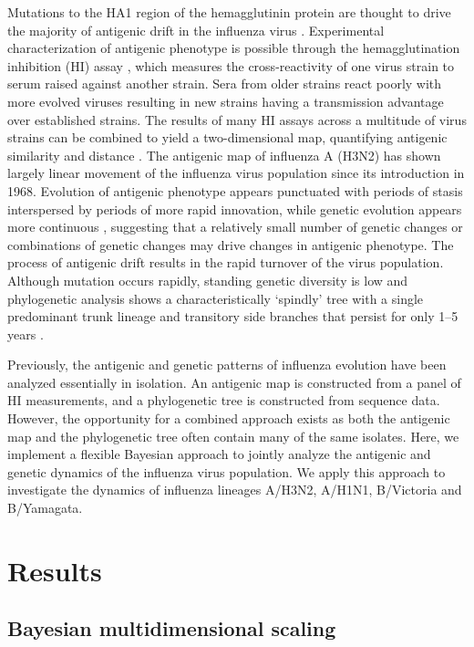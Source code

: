 \documentclass[11pt,oneside,letterpaper]{article}
\begin{document}
Mutations to the HA1 region of the hemagglutinin protein are thought to drive the majority of antigenic drift in the influenza virus \cite{Nelson07NatRevGenet}. 
Experimental characterization of antigenic phenotype is possible through the hemagglutination inhibition (HI) assay \cite{Hirst43}, which measures the cross-reactivity of one virus strain to serum raised against another strain. 
Sera from older strains react poorly with more evolved viruses resulting in new strains having a transmission advantage over established strains. 
The results of many HI assays across a multitude of virus strains can be combined to yield a two-dimensional map, quantifying antigenic similarity and distance \cite{Smith04}. 
The antigenic map of influenza A (H3N2) has shown largely linear movement of the influenza virus population since its introduction in 1968. 
Evolution of antigenic phenotype appears punctuated with periods of stasis interspersed by periods of more rapid innovation, while genetic evolution appears more continuous \cite{Smith04}, suggesting that a relatively small number of genetic changes or combinations of genetic changes may drive changes in antigenic phenotype. 
The process of antigenic drift results in the rapid turnover of the virus population. 
Although mutation occurs rapidly, standing genetic diversity is low and phylogenetic analysis shows a characteristically `spindly' tree with a single predominant trunk lineage and transitory side branches that persist for only 1--5 years \cite{Fitch97}.

Previously, the antigenic and genetic patterns of influenza evolution have been analyzed essentially in isolation. 
An antigenic map is constructed from a panel of HI measurements, and a phylogenetic tree is constructed from sequence data. 
However, the opportunity for a combined approach exists as both the antigenic map and the phylogenetic tree often contain many of the same isolates. 
Here, we implement a flexible Bayesian approach to jointly analyze the antigenic and genetic dynamics of the influenza virus population. 
We apply this approach to investigate the dynamics of influenza lineages A/H3N2,  A/H1N1, B/Victoria and B/Yamagata. 

\section*{Results}

\subsection*{Bayesian multidimensional scaling}
\end{document}
